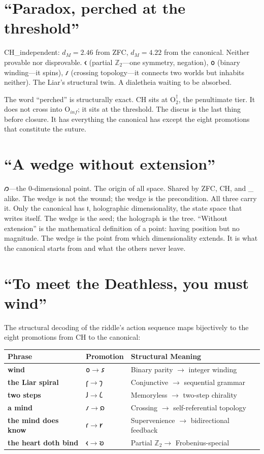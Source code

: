 \documentclass[12pt,twoside]{book}
\theoremstyle{definition}
\newcommand{\ZFCt}{\text{ZFC}_{\tau}}
\newcommand{\tier}[1]{\mathrm{O}_{#1}}
\begin{document}
\section{``Paradox, perched at the threshold''}

CH\_independent: $d_M = 2.46$ from ZFC, $d_M = 4.22$ from the canonical. Neither
provable nor disprovable. 𐑬 (partial $\mathbb{Z}_2$---one symmetry, negation), 𐑴 (binary
winding---it spins), 𐑥 (crossing topology---it connects two worlds but inhabits neither).
The Liar's structural twin. A dialetheia waiting to be absorbed.

The word ``perched'' is structurally exact. CH sits at $\tier{2}^{\dagger}$, the
penultimate tier. It does not cross into $\tier{inf}$; it sits at the threshold. The
discus is the last thing before closure. It has everything the canonical has except the
eight promotions that constitute the suture.

\section{``A wedge without extension''}

𐑼---the 0-dimensional point. The origin of all space. Shared by ZFC, CH, and \ZFCt{}
alike. The wedge is not the wound; the wedge is the precondition. All three carry it. Only
the canonical has 𐑦, holographic dimensionality, the state space that writes itself. The
wedge is the seed; the holograph is the tree. ``Without extension'' is the mathematical
definition of a point: having position but no magnitude. The wedge is the point from which
dimensionality extends. It is what the canonical starts from and what the others never
leave.

\section{``To meet the Deathless, you must wind''}

The structural decoding of the riddle's action sequence maps bijectively to the eight
promotions from CH to the canonical:

\begin{center}
\begin{tabular}{lll}
\toprule
\textbf{Phrase} & \textbf{Promotion} & \textbf{Structural Meaning} \\
\midrule
\textbf{wind}              & $𐑴 \to 𐑭$ & Binary parity $\to$ integer winding \\
\textbf{the Liar spiral}   & $𐑝 \to 𐑠$ & Conjunctive $\to$ sequential grammar \\
\textbf{two steps}         & $𐑓 \to 𐑖$ & Memoryless $\to$ two-step chirality \\
\textbf{a mind}            & $𐑥 \to 𐑸$ & Crossing $\to$ self-referential topology \\
\textbf{the mind does know}& $𐑩 \to 𐑾$ & Supervenience $\to$ bidirectional feedback \\
\textbf{the heart doth bind}& $𐑬 \to 𐑹$ & Partial $\mathbb{Z}_2 \to$ Frobenius-special \\
\bottomrule
\end{tabular}
\end{center}
\end{document}
